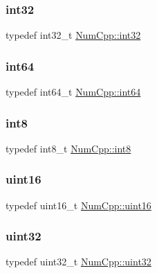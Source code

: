 \subsubsection{\texorpdfstring{int32}{int32}}
{\footnotesize\ttfamily typedef int32\+\_\+t \mbox{\hyperlink{namespace_num_cpp_acf3eb1592f8b248ff0a236634864633c}{Num\+Cpp\+::int32}}}

\mbox{\label{namespace_num_cpp_a22e530c7304044b86c04203429f3dcd1}} 
\subsubsection{\texorpdfstring{int64}{int64}}
{\footnotesize\ttfamily typedef int64\+\_\+t \mbox{\hyperlink{namespace_num_cpp_a22e530c7304044b86c04203429f3dcd1}{Num\+Cpp\+::int64}}}

\mbox{\label{namespace_num_cpp_a7f7ba56fbcdea3aa31f11382416d2e4d}} 
\subsubsection{\texorpdfstring{int8}{int8}}
{\footnotesize\ttfamily typedef int8\+\_\+t \mbox{\hyperlink{namespace_num_cpp_a7f7ba56fbcdea3aa31f11382416d2e4d}{Num\+Cpp\+::int8}}}

\mbox{\label{namespace_num_cpp_a3078cddd091529b8dd3e7828fa9a9926}} 
\subsubsection{\texorpdfstring{uint16}{uint16}}
{\footnotesize\ttfamily typedef uint16\+\_\+t \mbox{\hyperlink{namespace_num_cpp_a3078cddd091529b8dd3e7828fa9a9926}{Num\+Cpp\+::uint16}}}

\mbox{\label{namespace_num_cpp_a36f388e948380413c63011cab9b7fbd5}} 
\subsubsection{\texorpdfstring{uint32}{uint32}}
{\footnotesize\ttfamily typedef uint32\+\_\+t \mbox{\hyperlink{namespace_num_cpp_a36f388e948380413c63011cab9b7fbd5}{Num\+Cpp\+::uint32}}}

